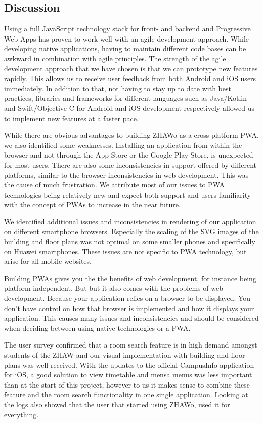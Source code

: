 \begin{markdown}
\section{Discussion} \label{discussion}

Using a full JavaScript technology stack for front- and backend and Progressive Web Apps has proven to work well with an agile development approach. While developing native applications, having to maintain different code bases can be awkward in combination with agile principles. The strength of the agile development approach that we have chosen is that we can prototype new features rapidly. This allows us to receive user feedback from both Android and iOS users immediately. In addition to that, not having to stay up to date with best practices, libraries and frameworks for different languages such as Java/Kotlin and Swift/Objective C for Android and iOS development respectively allowed us to implement new features at a faster pace.

While there are obvious advantages to building ZHAWo as a cross platform PWA, we also identified some weaknesses. Installing an application from within the browser and not through the App Store or the Google Play Store, is unexpected for most users. There are also some inconsistencies in support offered by different platforms, similar to the browser inconsistencies in web development. This was the cause of much frustration. We attribute most of our issues to PWA technologies being relatively new and expect both support and users familiarity with the concept of PWAs to increase in the near future. 

We identified additional issues and inconsistencies in rendering of our application on different smartphone browsers. Especially the scaling of the SVG images of the building and floor plans was not optimal on some smaller phones and specifically on Huawei smartphones. These issues are not specific to PWA technology, but arise for all mobile websites.

Building PWAs gives you the the benefits of web development, for instance being platform independent. But but it also comes with the problems of web development. Because your application relies on a browser to be displayed. You don't have control on how that browser is implemented and how it displays your application. This causes many issues and inconsistencies and should be considered when deciding between using native technologies or a PWA.

The user survey confirmed that a room search feature is in high demand amongst students of the ZHAW and our visual implementation with building and floor plans was well received. With the updates to the official CampusInfo application for iOS, a good solution to view timetable and mensa menus was less important than at the start of this project, however to us it makes sense to combine these feature and the room search functionality in one single application.
Looking at the logs also showed that the user that started using ZHAWo, used it for everything.

\end{markdown}

